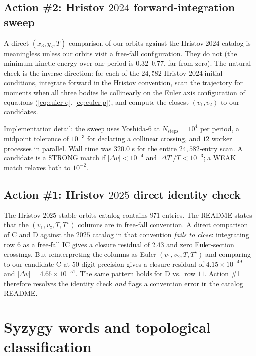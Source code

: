 \documentclass[11pt]{article}
\newcommand{\Tstar}{T^{\star}}
\begin{document}
\subsection{Action \#2: Hristov $2024$ forward-integration sweep}

A direct $(x_3, y_3, T)$ comparison of our orbits against the Hristov
$2024$ catalog is meaningless unless our orbits visit a free-fall
configuration. They do not (the minimum kinetic energy over one period
is $0.32$--$0.77$, far from zero). The natural check is the inverse
direction: for each of the $24{,}582$ Hristov $2024$ initial
conditions, integrate forward in the Hristov convention, scan the
trajectory for moments when all three bodies lie collinearly on the
Euler axis configuration of equations (\ref{eq:euler-q}, \ref{eq:euler-p}),
and compute the closest $(v_1, v_2)$ to our candidates.

Implementation detail: the sweep uses Yoshida-$6$ at $N_{\text{steps}} = 10^4$
per period, a midpoint tolerance of $10^{-3}$ for declaring a
collinear crossing, and $12$ worker processes in parallel. Wall time
was $320.0$ s for the entire $24{,}582$-entry scan. A candidate is a
STRONG match if
$|\Delta v| < 10^{-4}$ and $|\Delta T|/T < 10^{-3}$; a WEAK match
relaxes both to $10^{-2}$.

\subsection{Action \#1: Hristov $2025$ direct identity check}

The Hristov $2025$ stable-orbits catalog \citep{Hristov2025Stable}
contains $971$ entries. The README states that the $(v_1, v_2, T, \Tstar)$
columns are in free-fall convention. A direct comparison of C and D
against the $2025$ catalog in that convention \emph{fails to close}:
integrating row $6$ as a free-fall IC gives a closure residual of
$2.43$ and zero Euler-section crossings. But reinterpreting the
columns as Euler $(v_1, v_2, T, \Tstar)$ and comparing to our
candidate C at $50$-digit precision gives a closure residual of
$4.15\!\times\!10^{-49}$ and $|\Delta v| = 4.65\!\times\!10^{-51}$. The
same pattern holds for D vs.\ row $11$. Action \#1 therefore
resolves the identity check \emph{and} flags a convention error in
the catalog README.

\section{Syzygy words and topological classification}
\label{sec:topology}
\end{document}
